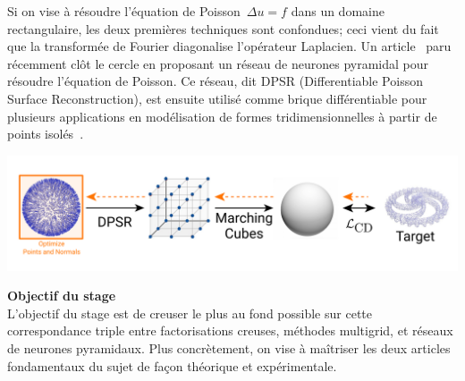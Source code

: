 \documentclass[a4paper,11pt]{article}
\begin{document}
Si on vise à résoudre l'équation de Poisson~$\Delta u = f$ dans un domaine
rectangulaire, les deux premières techniques sont confondues; ceci vient du
fait que la transformée de Fourier diagonalise l'opérateur Laplacien.
Un article~\cite{sap} paru récemment
clôt le cercle en proposant un réseau
de neurones pyramidal pour résoudre l'équation de Poisson.
Ce réseau, dit DPSR (Differentiable Poisson Surface Reconstruction), est ensuite
utilisé comme brique différentiable pour plusieurs applications en modélisation
de formes tridimensionnelles à partir de points isolés~\cite{psr}.
\\
\centerline{%
	\includegraphics[width=0.8\linewidth]{f/pipeline_optim.png}%
}



{\bf Objectif du stage}\\
L'objectif du stage est de creuser le plus au fond possible sur cette
correspondance triple entre factorisations creuses, méthodes multigrid, et
réseaux de neurones pyramidaux.  Plus concrètement, on vise à maîtriser les
deux articles~\cite{psr,sap} fondamentaux %
du sujet de façon théorique et expérimentale.
\end{document}

